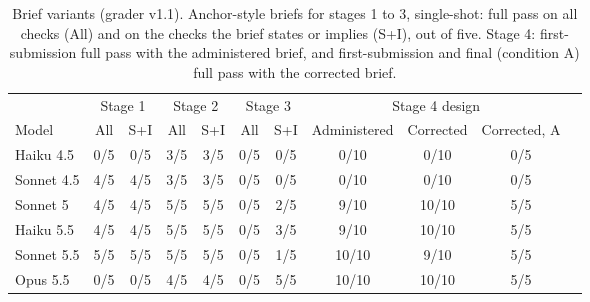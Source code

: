 \begin{table}[t]
\caption{Brief variants (grader v1.1). Anchor-style briefs for stages 1 to 3, single-shot: full pass on all checks (All) and on the checks the brief states or implies (S+I), out of five. Stage 4: first-submission full pass with the administered brief, and first-submission and final (condition A) full pass with the corrected brief.}
\label{tab:variants}
\footnotesize
\setlength{\tabcolsep}{3.5pt}
\begin{tabular}{lcccccccccc}
\toprule
& \multicolumn{2}{c}{Stage 1} & \multicolumn{2}{c}{Stage 2} & \multicolumn{2}{c}{Stage 3} & \multicolumn{3}{c}{Stage 4 design}\\
\cmidrule(lr){2-3}\cmidrule(lr){4-5}\cmidrule(lr){6-7}\cmidrule(lr){8-10}
Model & All & S+I & All & S+I & All & S+I & Administered & Corrected & Corrected, A\\
\midrule
Haiku 4.5 & 0/5 & 0/5 & 3/5 & 3/5 & 0/5 & 0/5 & 0/10 & 0/10 & 0/5\\
Sonnet 4.5 & 4/5 & 4/5 & 3/5 & 3/5 & 0/5 & 0/5 & 0/10 & 0/10 & 0/5\\
Sonnet 5 & 4/5 & 4/5 & 5/5 & 5/5 & 0/5 & 2/5 & 9/10 & 10/10 & 5/5\\
Haiku 5.5 & 4/5 & 4/5 & 5/5 & 5/5 & 0/5 & 3/5 & 9/10 & 10/10 & 5/5\\
Sonnet 5.5 & 5/5 & 5/5 & 5/5 & 5/5 & 0/5 & 1/5 & 10/10 & 9/10 & 5/5\\
Opus 5.5 & 0/5 & 0/5 & 4/5 & 4/5 & 0/5 & 5/5 & 10/10 & 10/10 & 5/5\\
\bottomrule
\end{tabular}
\end{table}
